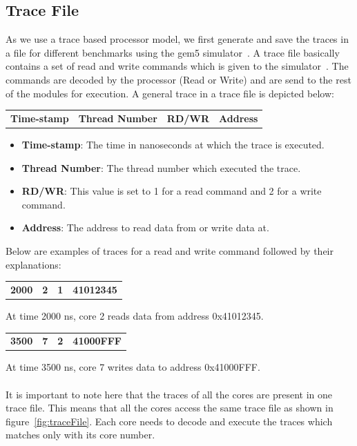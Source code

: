 \documentclass{listhesis}
\begin{document}
\subsection{Trace File}
As we use a trace based processor model, we first generate and save the traces in a file for different benchmarks using the gem5 simulator~\cite{gem5}. A trace file basically contains a set of read and write commands which is given to the simulator~\cite{akshay}. The commands are decoded by the processor (Read or Write) and are send to the rest of the modules for execution. A general trace in a trace file is depicted below:
\begin{table}[h!]
\begin{center}
 \begin{tabular}{c | c | c | c } 
 \textbf{Time-stamp} &  \textbf{Thread Number}  &  \textbf{RD/WR} &  \textbf{Address} \\ 
\end{tabular}
\end{center}
\end{table}
\begin{itemize}
  \item \textbf{Time-stamp}: The time in nanoseconds at which the trace is executed.
  \item \textbf{Thread Number}: The thread number which executed the trace.
  \item \textbf{RD/WR}: This value is set to 1 for a read command and 2 for a write command. 
  \item \textbf{Address}: The address to read data from or write data at.
\end{itemize}
Below are examples of traces for a read and write command followed by their explanations:
\begin{center}
 \begin{tabular}{c | c | c | c } 
 \textbf{2000} &  \textbf{2}  &  \textbf{1} &  \textbf{41012345} \\ 
\end{tabular}
\end{center}
At time 2000 ns, core 2 reads data from address 0x41012345.
\begin{center}
 \begin{tabular}{c | c | c | c } 
 \textbf{3500} &  \textbf{7}  &  \textbf{2} &  \textbf{41000FFF} \\ 
\end{tabular}
\end{center}
At time 3500 ns, core 7 writes data to address 0x41000FFF.\\
\\
It is important to note here that the traces of all the cores are present in one trace file. This means that all the cores access the same trace file as shown in figure~\ref{fig:traceFile}. Each core needs to decode and execute the traces which matches only with its core number.
\end{document}
